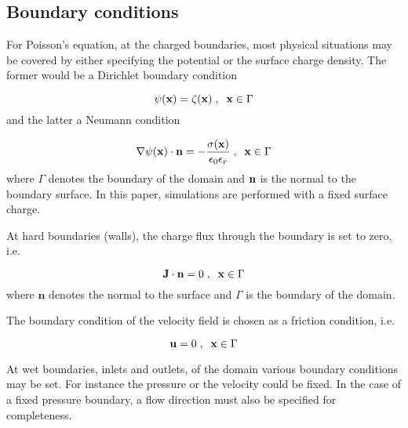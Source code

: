 \subsection{Boundary conditions}
For Poisson's equation, at the charged boundaries, most physical
situations may be covered by either specifying the potential or the
surface charge density. The former would be a Dirichlet boundary
condition

\begin{equation}
\mathrm{\psi}(\mathbf{x}) = \zeta(\mathbf{x})\;,\;\; \mathbf{x} \in \Gamma
\end{equation}
and the latter a Neumann condition 

\begin{equation}\label{eq:et:fix_c}
\nabla\mathrm{\psi}(\mathbf{x}) \cdot \mathbf{n} =
-\frac{\sigma(\mathbf{x})}{\epsilon_0\epsilon_r}\;,\;\; \mathbf{x} \in \Gamma
\end{equation}
where $\Gamma$ denotes the boundary of the domain and $\mathbf{n}$ is the
normal to the boundary surface.\- \cite{hlushkou} In this paper,
simulations are performed with a fixed surface charge.

At hard boundaries (walls), the charge flux through the boundary is
set to zero, i.e.

\begin{equation}\label{eq:et:j0}
\mathbf{J} \cdot \mathbf{n} = 0 \;,\;\; \mathbf{x} \in \Gamma
\end{equation}
where $\mathbf{n}$ denotes the normal to the surface and $\Gamma$ is
the boundary of the domain.

The boundary condition of the velocity field is chosen as a friction
condition, i.e.

\begin{equation}
\mathbf{u} = 0 \;,\;\; \mathbf{x} \in \Gamma
\end{equation} 

At wet boundaries, inlets and outlets, of the domain various boundary
conditions may be set. For instance the pressure or the velocity could
be fixed. In the case of a fixed pressure boundary, a flow direction
must also be specified for completeness. \cite{he_zou}

